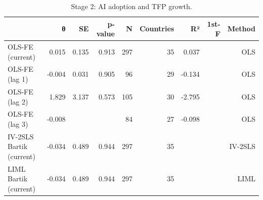 \begin{table}[t]
\centering\small
\begin{tabular}{lrrrrrrrr}
\toprule
 & θ & SE & p-value & N & Countries & R² & 1st-F & Method \\
\midrule
OLS-FE (current) & 0.015 & 0.135 & 0.913 & 297 & 35 & 0.037 &  & OLS \\
OLS-FE (lag 1) & -0.004 & 0.031 & 0.905 & 96 & 29 & -0.134 &  & OLS \\
OLS-FE (lag 2) & 1.829 & 3.137 & 0.573 & 105 & 30 & -2.795 &  & OLS \\
OLS-FE (lag 3) & -0.008 &  &  & 84 & 27 & -0.098 &  & OLS \\
IV-2SLS Bartik (current) & -0.034 & 0.489 & 0.944 & 297 & 35 &  &  & IV-2SLS \\
LIML Bartik (current) & -0.034 & 0.489 & 0.944 & 297 & 35 &  &  & LIML \\
\bottomrule
\end{tabular}
\caption{Stage 2: AI adoption and TFP growth.}
\label{tab:ai}
\end{table}